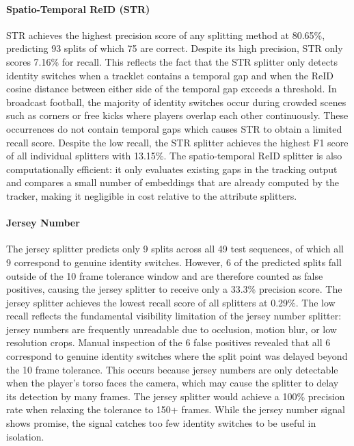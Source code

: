 \paragraph{Spatio-Temporal ReID (STR)}
STR achieves the highest precision score of any splitting method at 80.65\%, predicting 93 splits of which 75 are correct. Despite its high precision, STR only scores 7.16\% for recall. This reflects the fact that the STR splitter only detects identity switches when a tracklet contains a temporal gap and when the ReID cosine distance between either side of the temporal gap exceeds a threshold. In broadcast football, the majority of identity switches occur during crowded scenes such as corners or free kicks where players overlap each other continuously. These occurrences do not contain temporal gaps which causes STR to obtain a limited recall score. Despite the low recall, the STR splitter achieves the highest F1 score of all individual splitters with 13.15\%. The spatio-temporal ReID splitter is also computationally efficient: it only evaluates existing gaps in the tracking output and compares a small number of embeddings that are already computed by the tracker, making it negligible in cost relative to the attribute splitters.

\paragraph{Jersey Number}
The jersey splitter predicts only 9 splits across all 49 test sequences, of which all 9 correspond to genuine identity switches. However, 6 of the predicted splits fall outside of the 10 frame tolerance window and are therefore counted as false positives, causing the jersey splitter to receive only a 33.3\% precision score. The jersey splitter achieves the lowest recall score of all splitters at 0.29\%. The low recall reflects the fundamental visibility limitation of the jersey number splitter: jersey numbers are frequently unreadable due to occlusion, motion blur, or low resolution crops. Manual inspection of the 6 false positives revealed that all 6 correspond to genuine identity switches where the split point was delayed beyond the 10 frame tolerance. This occurs because jersey numbers are only detectable when the player's torso faces the camera, which may cause the splitter to delay its detection by many frames. The jersey splitter would achieve a 100\% precision rate when relaxing the tolerance to 150+ frames. While the jersey number signal shows promise, the signal catches too few identity switches to be useful in isolation.

